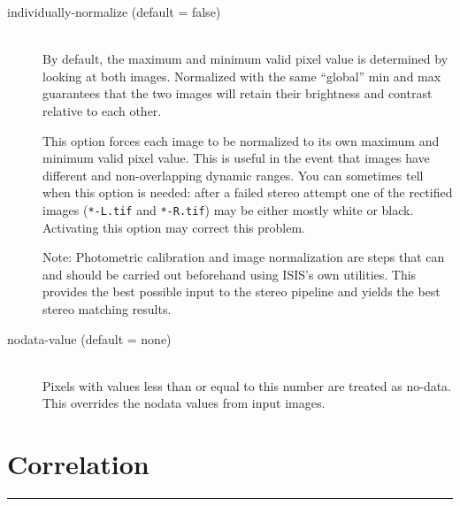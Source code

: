 \begin{description}
\item[individually-normalize \textnormal (default = false)] \hfill \\
  By default, the maximum and minimum valid pixel value is determined
  by looking at both images.  Normalized with the same ``global'' min
  and max guarantees that the two images will retain their brightness
  and contrast relative to each other.

  This option forces each image to be normalized to its own maximum
  and minimum valid pixel value. This is useful in the event that
  images have different and non-overlapping dynamic ranges. You can
  sometimes tell when this option is needed: after a failed stereo
  attempt one of the rectified images (\texttt{*-L.tif} and
  \texttt{*-R.tif}) may be either mostly white or black.  Activating
  this option may correct this problem.

  Note: Photometric calibration and image normalization are steps that
  can and should be carried out beforehand using ISIS's own utilities.
  This provides the best possible input to the stereo pipeline and
  yields the best stereo matching results.

\item[nodata-value \textnormal (default = none)] \hfill \\
  Pixels with values less than or equal to this number are treated as
  no-data. This overrides the nodata values from input images.

\end{description}

\section{Correlation}
\label{corr_section}
\hrule
\bigskip

